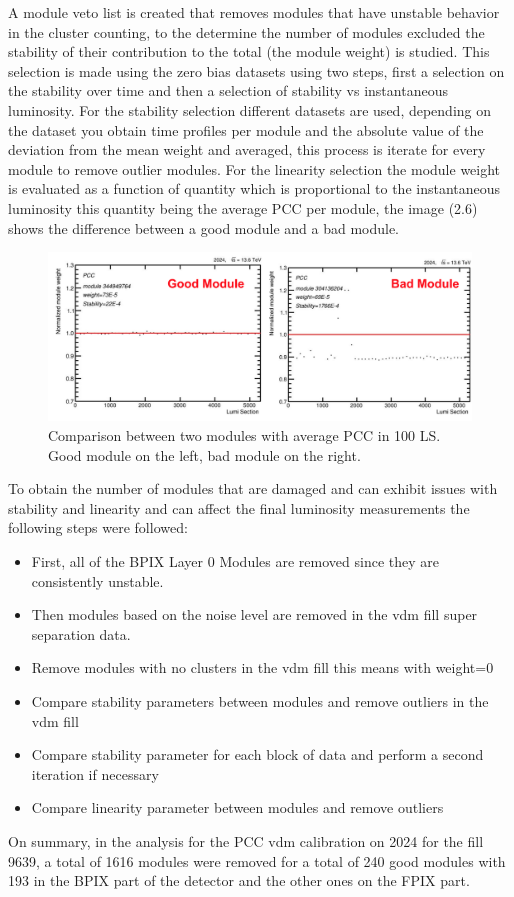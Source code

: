 A module veto list is created that removes modules that have unstable behavior in the cluster counting, to the determine the number of modules excluded the stability of their contribution to the total (the module weight) is studied. This selection is made using the zero bias datasets using two steps, first a selection on the stability over time and then a selection of stability vs instantaneous luminosity. For the stability selection different datasets are used, depending on the dataset you obtain time profiles per module and the absolute value of the deviation from the mean weight and averaged, this process is iterate for every module to remove outlier modules. For the linearity selection the module weight is evaluated as a function of quantity which is proportional to the instantaneous luminosity this quantity being the average PCC per module, the image (2.6) shows the difference between a good module and a bad module. 

\begin{figure}[H]
    \centering
    \includegraphics[height=0.35\textwidth ,width=1\textwidth]{module.png}
    \caption{Comparison between two modules with average PCC in 100 LS. Good module on the left, bad module on the right.}
    \label{fig:modules}
\end{figure}


To obtain the number of modules that are damaged and can exhibit issues with stability and linearity and can affect the final luminosity measurements the following steps were followed: 

\begin{itemize}
  \item First, all of the BPIX Layer 0 Modules are removed since they are consistently unstable.
  \item Then modules based on the noise level are removed in the vdm fill super separation data. 
  \item Remove modules with no clusters in the vdm fill this means with weight=0 
  \item Compare stability parameters between modules and remove outliers in the vdm fill
  \item Compare stability parameter for each block of data and perform a second iteration if necessary
  \item Compare linearity parameter between modules and remove outliers
\end{itemize}

On summary, in the analysis for the PCC vdm calibration on 2024 for the fill 9639, a total of 1616 modules were removed for a total of 240 good modules with 193 in the BPIX part of the detector and the other ones on the FPIX part. 
